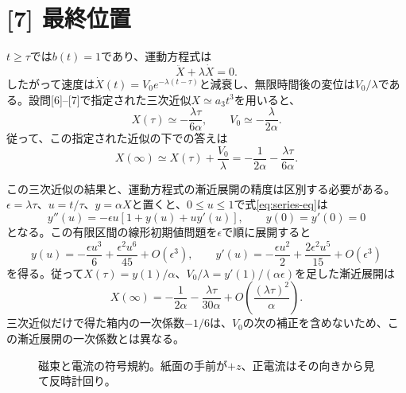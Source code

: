 \documentclass[11pt,a4paper]{article}
\begin{document}
\section*{[7] 最終位置}
$t\ge\tau$では$b(t)=1$であり、運動方程式は
\begin{equation}
  \ddot X+\lambda\dot X=0.
\end{equation}
したがって速度は$\dot X(t)=V_0e^{-\lambda(t-\tau)}$と減衰し、無限時間後の変位は$V_0/\lambda$である。設問[6]--[7]で指定された三次近似$X\simeq a_3t^3$を用いると、
\begin{equation}
  X(\tau)\simeq-\frac{\lambda\tau}{6\alpha},\qquad
  V_0\simeq-\frac{\lambda}{2\alpha}.
\end{equation}
従って、この指定された近似の下での答えは
\begin{equation}
  \boxed{X(\infty)\simeq X(\tau)+\frac{V_0}{\lambda}
    =-\frac{1}{2\alpha}-\frac{\lambda\tau}{6\alpha}}.
\end{equation}

この三次近似の結果と、運動方程式の漸近展開の精度は区別する必要がある。$\epsilon=\lambda\tau$、$u=t/\tau$、$y=\alpha X$と置くと、$0\le u\le1$で式\eqref{eq:series-eq}は
\begin{equation}
 y''(u)=-\epsilon u[1+y(u)+uy'(u)],\qquad y(0)=y'(0)=0
\end{equation}
となる。この有限区間の線形初期値問題を$\epsilon$で順に展開すると
\begin{equation}
 y(u)=-\frac{\epsilon u^3}{6}+\frac{\epsilon^2u^6}{45}+O(\epsilon^3),\qquad
 y'(u)=-\frac{\epsilon u^2}{2}+\frac{2\epsilon^2u^5}{15}+O(\epsilon^3)
\end{equation}
を得る。従って$X(\tau)=y(1)/\alpha$、$V_0/\lambda=y'(1)/(\alpha\epsilon)$を足した漸近展開は
\begin{equation}
 X(\infty)=-\frac{1}{2\alpha}-\frac{\lambda\tau}{30\alpha}
 +O\!\left(\frac{(\lambda\tau)^2}{\alpha}\right).
\end{equation}
三次近似だけで得た箱内の一次係数$-1/6$は、$V_0$の次の補正を含めないため、この漸近展開の一次係数とは異なる。

\begin{figure}[htbp]
\centering
{}
\caption{磁束と電流の符号規約。紙面の手前が$+z$、正電流はその向きから見て反時計回り。}
\label{fig:ring}
\end{figure}
\end{document}
